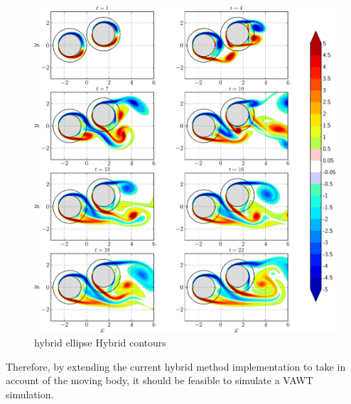 	\begin{figure}[!p]
	\centering
	\includegraphics[width=\linewidth]{./figures/validation/multipleCylinder/hybrid_multipleCylinder_contours_compressed-crop.png}
	\caption{hybrid ellipse Hybrid contours}
	\label{fig:hybrid_multipleCylinder_contours_compressed-crop}
	\end{figure}

Therefore, by extending the current hybrid method implementation to take in account of the moving body, it should be feasible to simulate a VAWT simulation.

